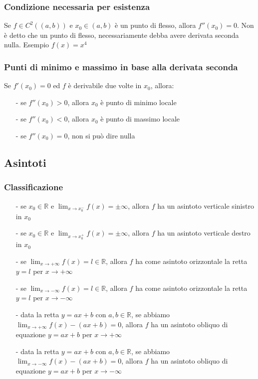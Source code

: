 \documentclass[a4paper]{article}
\newcommand\cont[2]{C^{#1} \left({#2}\right)}
\begin{document}
\subsubsection*{Condizione necessaria per esistenza}
Se \(f \in \cont{2}{\left(a, b\right)}\) e \(x_0 \in \left(a, b\right)\) è un punto di flesso, allora \(f''(x_0) = 0\). Non è
detto che un punto di flesso, necessariamente debba avere derivata seconda nulla. Esempio \(f(x) = x^4\)

\subsubsection*{Punti di minimo e massimo in base alla derivata seconda}
Se \(f'(x_0) = 0\) ed \(f\) è derivabile due volte in \(x_0\), allora:
\begin{itemize} [topsep=3pt, itemsep=0pt]
	\item[-] se \(f''(x_0) > 0\), allora \(x_0\) è punto di minimo locale
	\item[-] se \(f''(x_0) < 0\), allora \(x_0\) è punto di massimo locale
	\item[-] se \(f''(x_0) = 0\), non si può dire nulla
\end{itemize}


\subsection{Asintoti}
\subsubsection*{Classificazione}
\begin{itemize}
	\item[-] se \(x_0 \in \mathbb{R}\) e \(\displaystyle \lim_{x \to x_0^-} f(x) = \pm \infty\), allora \(f\) ha un asintoto verticale sinistro in \(x_0\)
	\item[-] se \(x_0 \in \mathbb{R}\) e \(\displaystyle \lim_{x \to x_0^+} f(x) = \pm \infty\), allora \(f\) ha un asintoto verticale destro in \(x_0\)
	\item[-] se \(\displaystyle \lim_{x \to + \infty} f(x) = l \in \mathbb{R}\), allora \(f\) ha come asintoto orizzontale la retta \(y = l\) per \(x \to + \infty\)
	\item[-] se \(\displaystyle \lim_{x \to - \infty} f(x) = l \in \mathbb{R}\), allora \(f\) ha come asintoto orizzontale la retta \(y = l\) per \(x \to - \infty\)
	\item[-] data la retta \(y = ax + b\) con \(a,b \in \mathbb{R}\), se abbiamo \(\displaystyle \lim_{x \to + \infty} f(x) - \left(ax + b\right) = 0\), allora
	\(f\) ha un asintoto obliquo di equazione \(y = ax + b\) per \(x \to + \infty\)
	\item[-] data la retta \(y = ax + b\) con \(a,b \in \mathbb{R}\), se abbiamo \(\displaystyle \lim_{x \to - \infty} f(x) - \left(ax + b\right) = 0\), allora
	\(f\) ha un asintoto obliquo di equazione \(y = ax + b\) per \(x \to - \infty\)
\end{itemize}
\end{document}
